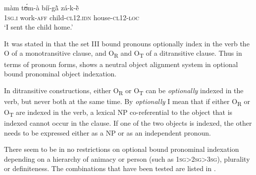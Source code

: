 \documentclass[output=paper]{langsci/langscibook}
\begin{document}
\z

\ea
\label{ex:23.pacchiarotti}
\gll màm    tʊ́m-à    bíí-g\`{ã}      zá-k-\`{ẽ} \\
\textsc{1sg.i}    work-\textsc{aff}  child-\textsc{cl12.idn}  house-\textsc{cl12-loc}\\
\glt `I sent the child home.'\footnotemark {} 
\z

\z

It was stated in  that the set III bound pronouns optionally index in the verb the O of a monotransitive clause, and O\textsubscript{R} and O\textsubscript{T} of a ditransitive clause. Thus in terms of pronoun forms,  shows a neutral object alignment system in optional bound pronominal object indexation.  

In ditransitive constructions, either O\textsubscript{R} or O\textsubscript{T} can be \textit{optionally} indexed in the verb, but never both at the same time. By \textit{optionally} I mean that if either O\textsubscript{R} or O\textsubscript{T} are indexed in the verb, a lexical NP co-referential to the object that is indexed cannot occur in the clause. If one of the two objects is indexed, the other needs to be expressed either as a NP or as an independent pronoun. 

There seem to be in  no restrictions on optional bound pronominal indexation depending on a hierarchy of animacy or person (such as 1\textsc{sg}>2\textsc{sg}>3\textsc{sg}), plurality or definiteness. The combinations that have been tested are listed in .
\end{document}
